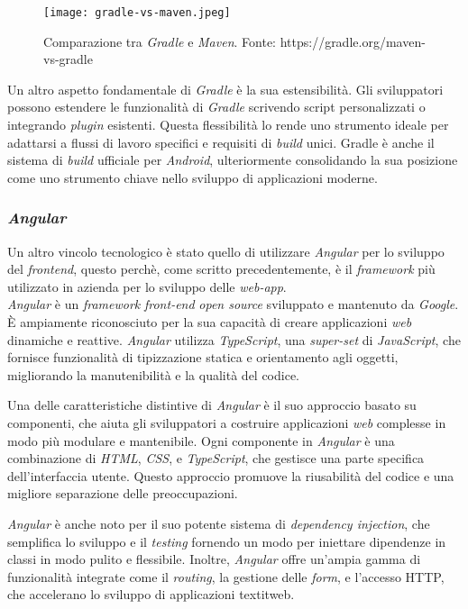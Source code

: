  \begin{figure}[!h] 
  \centering 
  \texttt{[image: gradle-vs-maven.jpeg]} 
  \caption{Comparazione tra \textit{Gradle} e \textit{Maven}. Fonte: https://gradle.org/maven-vs-gradle}
  \label{fig:gredle-vs-maven}
\end{figure}

Un altro aspetto fondamentale di \textit{Gradle} è la sua estensibilità. Gli sviluppatori possono estendere le funzionalità di \textit{Gradle} 
scrivendo script personalizzati o integrando \textit{plugin} esistenti. Questa flessibilità lo rende uno strumento ideale per adattarsi a 
flussi di lavoro specifici e requisiti di \textit{build} unici. Gradle è anche il sistema di \textit{build} ufficiale per \textit{Android}, ulteriormente 
consolidando la sua posizione come uno strumento chiave nello sviluppo di applicazioni moderne.

\subsubsection*{\textit{Angular}}
Un altro vincolo tecnologico è stato quello di utilizzare \textit{Angular} per lo sviluppo del \textit{frontend}, 
questo perchè, come scritto precedentemente, è il \textit{framework} più utilizzato in azienda per lo sviluppo delle \textit{web-app}.\\

\textit{Angular} è un \textit{framework} \textit{front-end} \textit{open source} sviluppato e mantenuto da \textit{Google}. 
È ampiamente riconosciuto per la sua capacità di creare applicazioni \textit{web} dinamiche e reattive. 
\textit{Angular} utilizza \textit{TypeScript}, una \textit{super-set} di \textit{JavaScript}, che fornisce funzionalità di tipizzazione statica e 
orientamento agli oggetti, migliorando la manutenibilità e la qualità del codice.

Una delle caratteristiche distintive di \textit{Angular} è il suo approccio basato su componenti, che aiuta gli sviluppatori a 
costruire applicazioni \textit{web} complesse in modo più modulare e mantenibile. Ogni componente in \textit{Angular} è una combinazione di \textit{HTML}, 
\textit{CSS}, e \textit{TypeScript}, che gestisce una parte specifica dell'interfaccia utente. Questo approccio promuove la riusabilità 
del codice e una migliore separazione delle preoccupazioni.

\textit{Angular} è anche noto per il suo potente sistema di \textit{dependency injection}, che semplifica lo sviluppo e il \textit{testing} fornendo un 
modo per iniettare dipendenze in classi in modo pulito e flessibile. Inoltre, \textit{Angular} offre un'ampia gamma di funzionalità integrate come il 
\textit{routing}, la gestione delle \textit{form}, e l'accesso HTTP, che accelerano lo sviluppo di applicazioni textit{web}.

